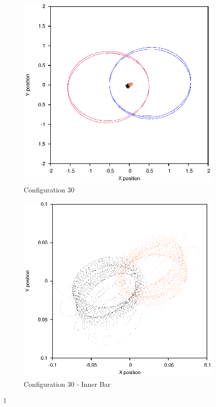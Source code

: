 \documentclass[a4paper,12pt]{article}
\begin{document}
\begin{figure}[H]
\centering
\includegraphics[width=0.9\textwidth]{./2017results/1-1-1-1/Orbit.eps}
\caption{Configuration 30}
\label{fig:config30}
\end{figure}
\begin{figure}[H]
\centering
\includegraphics[width=0.9\textwidth]{./2017results/1-1-1-1/Inner.eps}
\caption{Configuration 30 - Inner Bar}
\label{fig:config30i}
\end{figure}l
\end{document}
